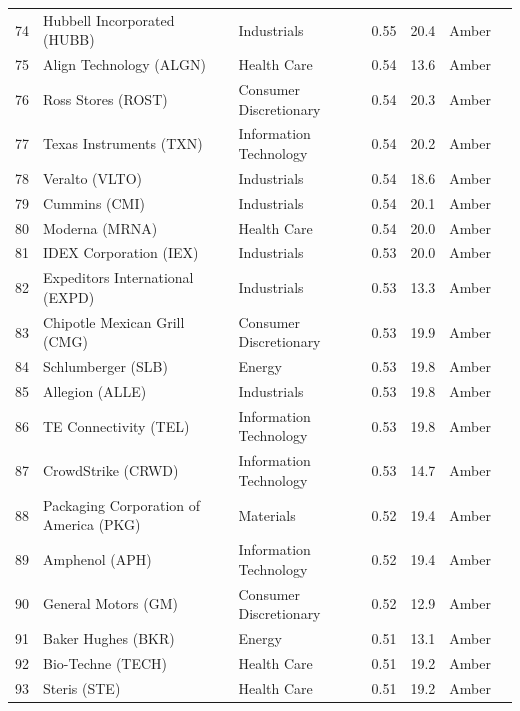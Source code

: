 \documentclass[11pt,a4paper]{article}
\begin{document}
{\begin{longtable}{r p{4.4cm} p{2.8cm} r r l l}
74 & Hubbell Incorporated (HUBB) & Industrials & 0.55 & 20.4 & \cellcolor[HTML]{FFEB9C}Amber &  \\
75 & Align Technology (ALGN) & Health Care & 0.54 & 13.6 & \cellcolor[HTML]{FFEB9C}Amber &  \\
76 & Ross Stores (ROST) & Consumer Discretionary & 0.54 & 20.3 & \cellcolor[HTML]{FFEB9C}Amber &  \\
77 & Texas Instruments (TXN) & Information Technology & 0.54 & 20.2 & \cellcolor[HTML]{FFEB9C}Amber &  \\
78 & Veralto (VLTO) & Industrials & 0.54 & 18.6 & \cellcolor[HTML]{FFEB9C}Amber &  \\
79 & Cummins (CMI) & Industrials & 0.54 & 20.1 & \cellcolor[HTML]{FFEB9C}Amber &  \\
80 & Moderna (MRNA) & Health Care & 0.54 & 20.0 & \cellcolor[HTML]{FFEB9C}Amber &  \\
81 & IDEX Corporation (IEX) & Industrials & 0.53 & 20.0 & \cellcolor[HTML]{FFEB9C}Amber &  \\
82 & Expeditors International (EXPD) & Industrials & 0.53 & 13.3 & \cellcolor[HTML]{FFEB9C}Amber &  \\
83 & Chipotle Mexican Grill (CMG) & Consumer Discretionary & 0.53 & 19.9 & \cellcolor[HTML]{FFEB9C}Amber &  \\
84 & Schlumberger (SLB) & Energy & 0.53 & 19.8 & \cellcolor[HTML]{FFEB9C}Amber &  \\
85 & Allegion (ALLE) & Industrials & 0.53 & 19.8 & \cellcolor[HTML]{FFEB9C}Amber &  \\
86 & TE Connectivity (TEL) & Information Technology & 0.53 & 19.8 & \cellcolor[HTML]{FFEB9C}Amber &  \\
87 & CrowdStrike (CRWD) & Information Technology & 0.53 & 14.7 & \cellcolor[HTML]{FFEB9C}Amber &  \\
88 & Packaging Corporation of America (PKG) & Materials & 0.52 & 19.4 & \cellcolor[HTML]{FFEB9C}Amber &  \\
89 & Amphenol (APH) & Information Technology & 0.52 & 19.4 & \cellcolor[HTML]{FFEB9C}Amber &  \\
90 & General Motors (GM) & Consumer Discretionary & 0.52 & 12.9 & \cellcolor[HTML]{FFEB9C}Amber &  \\
91 & Baker Hughes (BKR) & Energy & 0.51 & 13.1 & \cellcolor[HTML]{FFEB9C}Amber &  \\
92 & Bio-Techne (TECH) & Health Care & 0.51 & 19.2 & \cellcolor[HTML]{FFEB9C}Amber &  \\
93 & Steris (STE) & Health Care & 0.51 & 19.2 & \cellcolor[HTML]{FFEB9C}Amber &  \\

\end{longtable}}
\end{document}
